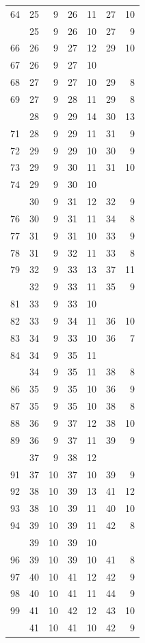 \begin{Schunk}
\begin{longtable}{rrrrrrr}
64 & 25 & 9 & 26 & 11 & 27 & 10\\
\addlinespace
65 & 25 & 9 & 26 & 10 & 27 & 9\\
66 & 26 & 9 & 27 & 12 & 29 & 10\\
67 & 26 & 9 & 27 & 10 &  & \\
68 & 27 & 9 & 27 & 10 & 29 & 8\\
69 & 27 & 9 & 28 & 11 & 29 & 8\\
\addlinespace
70 & 28 & 9 & 29 & 14 & 30 & 13\\
71 & 28 & 9 & 29 & 11 & 31 & 9\\
72 & 29 & 9 & 29 & 10 & 30 & 9\\
73 & 29 & 9 & 30 & 11 & 31 & 10\\
74 & 29 & 9 & 30 & 10 &  & \\
\addlinespace
75 & 30 & 9 & 31 & 12 & 32 & 9\\
76 & 30 & 9 & 31 & 11 & 34 & 8\\
77 & 31 & 9 & 31 & 10 & 33 & 9\\
78 & 31 & 9 & 32 & 11 & 33 & 8\\
79 & 32 & 9 & 33 & 13 & 37 & 11\\
\addlinespace
80 & 32 & 9 & 33 & 11 & 35 & 9\\
81 & 33 & 9 & 33 & 10 &  & \\
82 & 33 & 9 & 34 & 11 & 36 & 10\\
83 & 34 & 9 & 33 & 10 & 36 & 7\\
84 & 34 & 9 & 35 & 11 &  & \\
\addlinespace
85 & 34 & 9 & 35 & 11 & 38 & 8\\
86 & 35 & 9 & 35 & 10 & 36 & 9\\
87 & 35 & 9 & 35 & 10 & 38 & 8\\
88 & 36 & 9 & 37 & 12 & 38 & 10\\
89 & 36 & 9 & 37 & 11 & 39 & 9\\
\addlinespace
90 & 37 & 9 & 38 & 12 &  & \\
91 & 37 & 10 & 37 & 10 & 39 & 9\\
92 & 38 & 10 & 39 & 13 & 41 & 12\\
93 & 38 & 10 & 39 & 11 & 40 & 10\\
94 & 39 & 10 & 39 & 11 & 42 & 8\\
\addlinespace
95 & 39 & 10 & 39 & 10 &  & \\
96 & 39 & 10 & 39 & 10 & 41 & 8\\
97 & 40 & 10 & 41 & 12 & 42 & 9\\
98 & 40 & 10 & 41 & 11 & 44 & 9\\
99 & 41 & 10 & 42 & 12 & 43 & 10\\
\addlinespace
100 & 41 & 10 & 41 & 10 & 42 & 9\\*
\end{longtable}

\end{Schunk}

